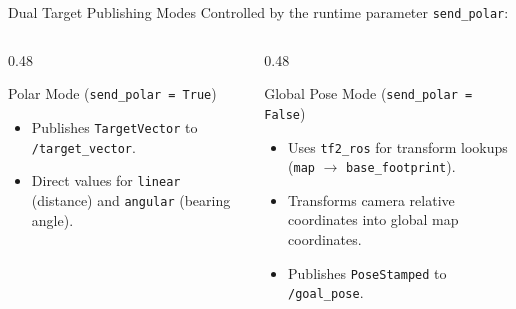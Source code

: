 \documentclass[aspectratio=169, 11pt]{beamer}
\begin{document}
\begin{frame}{Dual Target Publishing Modes}
    Controlled by the runtime parameter \texttt{send\_polar}:

    \vspace{0.4cm}
    \begin{columns}[t]
        \begin{column}{0.48\textwidth}
            \begin{block}{Polar Mode (\texttt{send\_polar = True})}
                \begin{itemize}
                    \item Publishes \texttt{TargetVector} to \texttt{/target\_vector}.
                    \item Direct values for \texttt{linear} (distance) and \texttt{angular} (bearing angle).
                \end{itemize}
            \end{block}
        \end{column}
        
        \begin{column}{0.48\textwidth}
            \begin{block}{Global Pose Mode (\texttt{send\_polar = False})}
                \begin{itemize}
                    \item Uses \texttt{tf2\_ros} for transform lookups (\texttt{map} $\rightarrow$ \texttt{base\_footprint}).
                    \item Transforms camera relative coordinates into global map coordinates.
                    \item Publishes \texttt{PoseStamped} to \texttt{/goal\_pose}.
                \end{itemize}
            \end{block}
        \end{column}
    \end{columns}
\end{frame}
\end{document}
